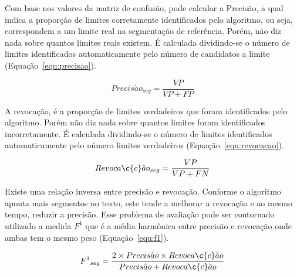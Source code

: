 Com base nos valores da matriz de confusão, pode calcular a Precisão, a qual indica a proporção de limites corretamente identificados pelo algoritmo, ou seja, correspondem a um limite real na segmentação de referência. 
Porém, não diz nada sobre quantos limites reais existem. 
É calculada dividindo-se o número de limites identificados automaticamente pelo número de candidatos a limite (Equação~\ref{equ:precisao}).
 
 \begin{equation}
	 Precis\tilde{a}o_{seg} = \frac{VP}{VP+FP}
	 \label{equ:precisao}
 \end{equation}


 A revocação, é a proporção de limites verdadeiros que foram identificados pelo algoritmo. Porém não diz nada sobre quantos limites foram identificados incorretamente. É calculada dividindo-se o número de limites identificados automaticamente pelo número limites verdadeiros (Equação~\ref{equ:revocacao}).
 
 \begin{equation}
	 Revoca\c{c}\tilde{a}o_{seg} = \frac{VP}{VP+FN}
	 \label{equ:revocacao}
 \end{equation}

 Existe uma relação inversa entre precisão e revocação. Conforme o algoritmo aponta mais segmentos no texto, este tende a melhorar a revocação e ao mesmo tempo, reduzir a precisão. Esse problema de avaliação pode ser contornado utilizado a medida $F^1$ que é a média harmônica entre precisão e revocação onde ambas tem o mesmo peso (Equação~\ref{equ:f1}). 

 \begin{equation}
	 {F^1}_{seg} = \frac{2 \times Precis\tilde{a}o \times Revoca\c{c}\tilde{a}o}
		        {Precis\tilde{a}o + Revoca\c{c}\tilde{a}o}
	 \label{equ:f1}
 \end{equation}






